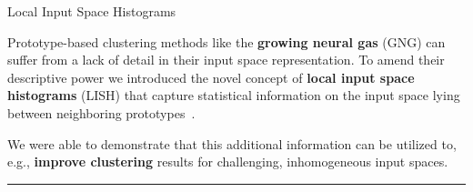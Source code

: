 


\begin{frame}{Local Input Space Histograms }

\vspace{1.5em}
\justifying
Prototype-based clustering methods like the {\bf growing neural gas} (GNG) can
suffer from a lack of detail in their input space representation. To amend their
descriptive power we introduced the novel concept of {\bf local input space 
histograms} (LISH) that capture statistical information on the input space lying
between neighboring prototypes~\cite{Kerdels2014a}.

\vspace{1.5em}


\vspace{1em}
We were able to demonstrate that this additional information can be utilized to,
e.g., {\bf improve clustering} results for challenging, inhomogeneous input 
spaces.

\begin{center}
\rule{2cm}{0.4pt}\\[0.5em]
\end{center}


\end{frame}



